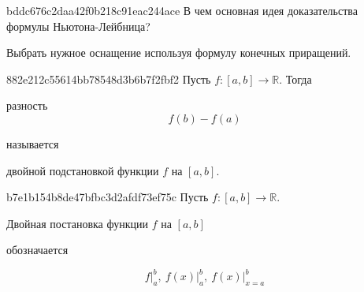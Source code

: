 
\begin{note}{bddc676c2daa42f0b218c91eac244ace}
    В чем основная идея доказательства формулы Ньютона-Лейбница?

    \begin{cloze}{1}
        Выбрать нужное оснащение используя формулу конечных приращений.
    \end{cloze}
\end{note}

\begin{note}{882e212c55614bb78548d3b6b7f2fbf2}
    Пусть \({ f : [a, b] \to \mathbb R }\). Тогда
    \begin{icloze}{1}
        разность
        \[
            f(b) - f(a)
        \]
    \end{icloze}
    называется \begin{icloze}{2}двойной подстановкой функции \({ f }\)  на \({ [a, b] }\).\end{icloze}
\end{note}

\begin{note}{b7e1b154b8de47bfbc3d2afdf73ef75c}
    Пусть \({ f : [a, b] \to \mathbb R }\).
    \begin{icloze}{1}Двойная постановка функции \({ f }\) на \({ [a, b] }\)\end{icloze} обозначается
    \begin{icloze}{2}
        \[
            f \big|_{a}^{b},\: f(x) \big|_{a}^{b},\: f(x) \big|_{x = a}^{b}
        \]
    \end{icloze}
\end{note}

